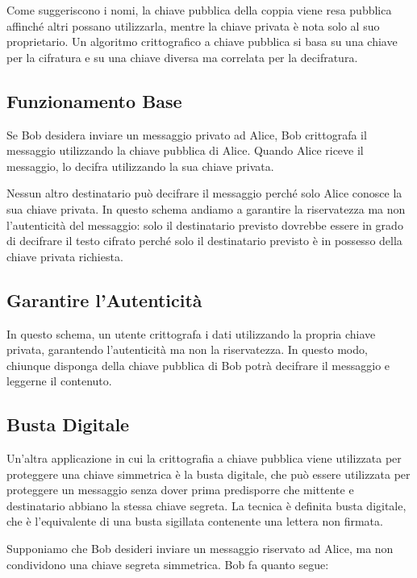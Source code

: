 Come suggeriscono i nomi, la chiave pubblica della coppia viene resa pubblica affinché altri possano utilizzarla, mentre la chiave privata è nota solo al suo proprietario. Un algoritmo crittografico a chiave pubblica si basa su una chiave per la cifratura e su una chiave diversa ma correlata per la decifratura.

\subsection{Funzionamento Base}

Se Bob desidera inviare un messaggio privato ad Alice, Bob crittografa il messaggio utilizzando la chiave pubblica di Alice. Quando Alice riceve il messaggio, lo decifra utilizzando la sua chiave privata.

Nessun altro destinatario può decifrare il messaggio perché solo Alice conosce la sua chiave privata. In questo schema andiamo a garantire la riservatezza ma non l'autenticità del messaggio: solo il destinatario previsto dovrebbe essere in grado di decifrare il testo cifrato perché solo il destinatario previsto è in possesso della chiave privata richiesta.

\subsection{Garantire l'Autenticità}

In questo schema, un utente crittografa i dati utilizzando la propria chiave privata, garantendo l'autenticità ma non la riservatezza. In questo modo, chiunque disponga della chiave pubblica di Bob potrà decifrare il messaggio e leggerne il contenuto.

\subsection{Busta Digitale}

Un'altra applicazione in cui la crittografia a chiave pubblica viene utilizzata per proteggere una chiave simmetrica è la busta digitale, che può essere utilizzata per proteggere un messaggio senza dover prima predisporre che mittente e destinatario abbiano la stessa chiave segreta. La tecnica è definita busta digitale, che è l'equivalente di una busta sigillata contenente una lettera non firmata.

Supponiamo che Bob desideri inviare un messaggio riservato ad Alice, ma non condividono una chiave segreta simmetrica. Bob fa quanto segue:

